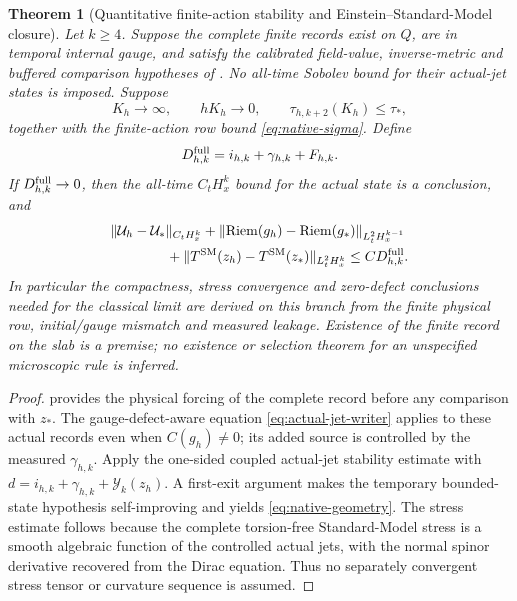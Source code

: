 \documentclass[11pt]{article}
\numberwithin{equation}{section}
\newtheorem{theorem}{Theorem}[section]
\theoremstyle{definition}
\theoremstyle{remark}
\newcommand{\Riem}{\operatorname{Riem}}
\newcommand{\norm}[1]{\lVert#1\rVert}
\begin{document}
\begin{theorem}[Quantitative finite-action stability and Einstein--Standard-Model closure]
\label{thm:native-closure}
Let $k\ge4$.  Suppose the complete finite records exist on $Q$, are in temporal internal gauge, and satisfy the calibrated field-value, inverse-metric and buffered comparison hypotheses of .  No all-time Sobolev bound for their actual-jet states is imposed.  Suppose
\[
 K_h\to\infty,\qquad hK_h\to0,\qquad
 \tau_{h,k+2}(K_h)\le\tau_*,
\]
together with the finite-action row bound \eqref{eq:native-sigma}.  Define
\begin{equation}
 D_{h,k}^{\rm full}=i_{h,k}+\gamma_{h,k}+F_{h,k}.
 \label{eq:native-total}
\end{equation}
If $D_{h,k}^{\rm full}\to0$, then the all-time $C_tH_x^k$ bound for the actual state is a conclusion, and
\begin{align}
 &\norm{\mathcal U_h-\mathcal U_*}_{C_tH_x^k}
 +\norm{\Riem(g_h)-\Riem(g_*)}_{L^2_tH_x^{k-1}}\notag\\
 &\hspace{4em}
 +\norm{T^{\rm SM}(z_h)-T^{\rm SM}(z_*)}_{L^2_tH_x^k}
 \le C D_{h,k}^{\rm full}.
 \label{eq:native-geometry}
\end{align}
In particular the compactness, stress convergence and zero-defect conclusions needed for the classical limit are derived on this branch from the finite physical row, initial/gauge mismatch and measured leakage.  Existence of the finite record on the slab is a premise; no existence or selection theorem for an unspecified microscopic rule is inferred.
\end{theorem}
\begin{proof}
 provides the physical forcing of the complete record before any comparison with $z_*$.  The gauge-defect-aware equation \eqref{eq:actual-jet-writer} applies to
these actual records even when $C(g_h)\ne0$; its added source is controlled
by the measured $\gamma_{h,k}$. Apply the one-sided coupled actual-jet
stability estimate  with
$d=i_{h,k}+\gamma_{h,k}+\mathcal Y_k(z_h)$.  A first-exit argument makes the temporary bounded-state hypothesis self-improving and yields \eqref{eq:native-geometry}.  The stress estimate follows because the complete torsion-free Standard-Model stress is a smooth algebraic function of the controlled actual jets, with the normal spinor derivative recovered from the Dirac equation.  Thus no separately convergent stress tensor or curvature sequence is assumed.
\end{proof}
\end{document}
